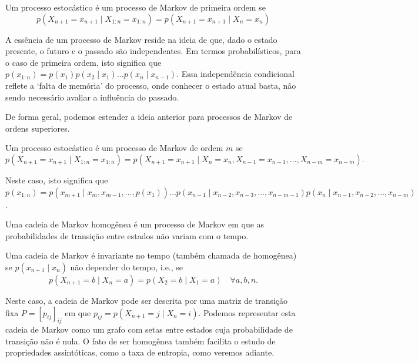 \begin{definition}
  Um processo estocástico é um processo de Markov de primeira ordem se
  \begin{equation}
     p(X_{n+1} = x_{n+1} \mid X_{1:n} = x_{1:n}) = p(X_{n+1} = x_{n+1} \mid X_n = x_n)
  \end{equation}
\end{definition}
A essência de um processo de Markov reside na ideia de que, dado o estado
presente, o futuro e o passado são independentes. Em termos probabilísticos,
para o caso de primeira ordem, isto significa que $p(x_{1:n}) = p(x_1)p(x_2 \mid x_1) \ldots p(x_n \mid x_{n-1})$.
Essa independência condicional reflete a `falta de memória' do processo,
onde conhecer o estado atual basta, não sendo necessário avaliar a influência do passado.

De forma geral, podemos estender a ideia anterior para processos de Markov
de ordens superiores.
\begin{definition}
  Um processo estocástico é um processo de Markov de ordem $m$ se
  \begin{equation}
    p(X_{n+1} = x_{n+1} \mid X_{1:n} = x_{1:n}) = p(X_{n+1} = x_{n+1} \mid X_n = x_n, X_{n-1} = x_{n-1}, \ldots , X_{n-m} = x_{n-m}) .
  \end{equation}
\end{definition}
Neste caso, isto significa que $p(x_{1:n}) = p(x_{m+1} \mid x_{m}, x_{m-1},
\ldots, p(x_1)) \ldots p(x_{n-1} \mid x_{n-2}, x_{n-3}, \ldots, x_{n-m-1})
p(x_n \mid x_{n-1}, x_{n-2}, \ldots, x_{n -m})$.


Uma cadeia de Markov homogênea é um processo de Markov em que as probabilidades
de transição entre estados não variam com o tempo.
\begin{definition}
  Uma cadeia de Markov é invariante no tempo (também chamada de homogênea) se $p(x_{n+1} \mid x_n)$ não
  depender do tempo, i.e., se
  \begin{equation}
    p(X_{n+1} = b \mid X_{n} = a) = p(X_2 = b \mid X_1 = a) \quad \forall a,b,n .
  \end{equation}
\end{definition}
Neste caso, a cadeia de Markov pode ser descrita por uma matriz de transição fixa $P = [p_{ij}]_{ij}$
em que $p_{ij} = p(X_{n+1} = j \mid X_{n} = i)$. Podemos representar esta cadeia de Markov como um grafo
com setas entre estados cuja probabilidade de transição não é nula.
O fato de ser homogênea também facilita o estudo de propriedades assintóticas,
como a taxa de entropia, como veremos adiante.

